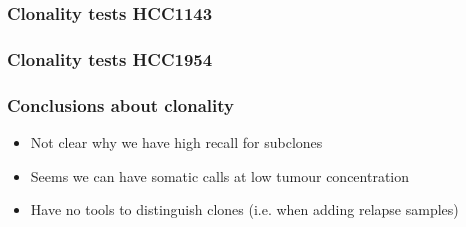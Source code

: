 \documentclass{beamer}
\begin{document}
\begin{frame}
\frametitle{Clonality tests HCC1143}
\end{frame}

\begin{frame}
\frametitle{Clonality tests HCC1954}
\end{frame}

\begin{frame}
\frametitle{Conclusions about clonality}
    \begin{itemize}
        \item Not clear why we have high recall for subclones
        \item Seems we can have somatic calls at low tumour concentration
        \item Have no tools to distinguish clones (i.e. when adding relapse samples)
    \end{itemize}
\end{frame}
\end{document}
